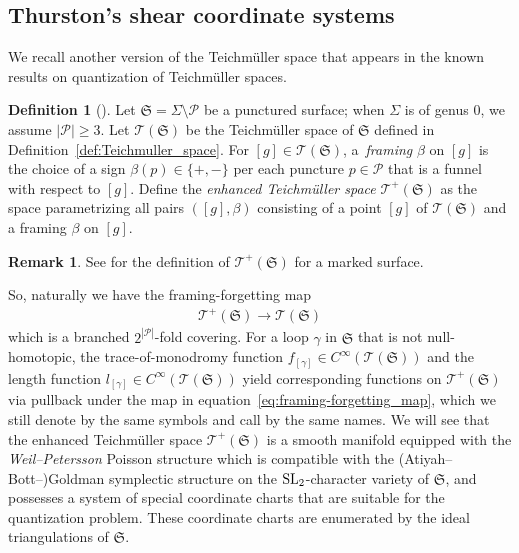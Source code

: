 \documentclass[10pt,a4paper]{amsart}
\numberwithin{equation}{section}
\theoremstyle{definition}
\newtheorem{Definition}[Theorem]{Definition}
\newtheorem{Remark}[Theorem]{Remark}
\begin{document}
\subsection{Thurston's shear coordinate systems}
\label{subsec:shear}
We recall another version of the Teichm\"uller space that appears in the known results on quantization of Teichm\"uller spaces.
\begin{Definition}[\cite{F97}]
\label{def:enhanced_Teichmuller_space}
Let $\mathfrak{S} = \Sigma\setminus \mathcal{P}$ be a punctured surface; when $\Sigma$ is of genus $0$, we assume $|\mathcal{P}|\ge 3$. Let $\mathscr{T}(\mathfrak{S})$ be the Teichm\"uller space of $\mathfrak{S}$ defined in Definition~\ref{def:Teichmuller_space}. For $[g] \in \mathscr{T}(\mathfrak{S})$, a~{\em framing} $\beta$ on $[g]$ is the choice of a sign $\beta(p) \in \{+,-\}$ per each puncture $p\in \mathcal{P}$ that is a funnel with respect to $[g]$.
Define the {\em enhanced Teichm\"uller space} $\mathscr{T}^+(\mathfrak{S})$ as the space parametrizing all pairs $([g], \beta)$ consisting of a point $[g]$ of $\mathscr{T}(\mathfrak{S})$ and a framing $\beta$ on $[g]$.
\end{Definition}
\begin{Remark}
See \cite{A16} for the definition of $\mathscr{T}^+(\mathfrak{S})$ for a marked surface.
\end{Remark}
So, naturally we have the framing-forgetting map
\begin{align}
\label{eq:framing-forgetting_map}
\mathscr{T}^+(\mathfrak{S}) \to \mathscr{T}(\mathfrak{S})
\end{align}
which is a branched $2^{|\mathcal{P}|}$-fold covering. For a loop $\gamma$ in $\mathfrak{S}$ that is not null-homotopic, the trace-of-monodromy function $f_{[\gamma]} \in C^\infty( \mathscr{T}(\mathfrak{S}))$ and the length function $l_{[\gamma]} \in C^\infty( \mathscr{T}(\mathfrak{S}))$ yield corresponding functions on $\mathscr{T}^+(\mathfrak{S})$ via pullback under the map in equation~\eqref{eq:framing-forgetting_map}, which we still denote by the same symbols and call by the same names.
We will see that the enhanced Teichm\"uller space $\mathscr{T}^+(\mathfrak{S})$ is a smooth manifold equipped with the {\it Weil--Petersson} Poisson structure which is compatible with the (Atiyah--Bott--)Goldman symplectic structure \cite{Goldman} on the ${\rm SL}_2$-character variety of $\mathfrak{S}$, and possesses a system of special coordinate charts that are suitable for the quantization problem. These coordinate charts are enumerated by the ideal triangulations of $\mathfrak{S}$.
\end{document}
